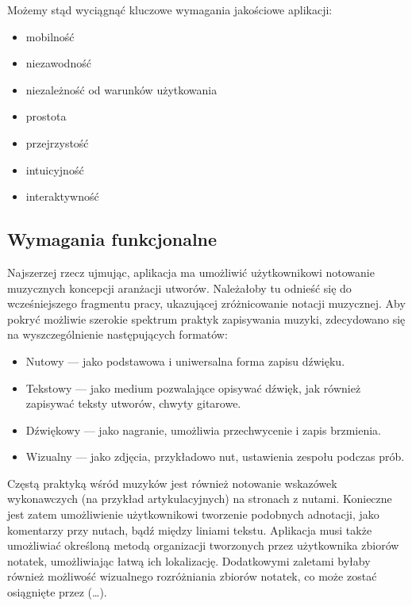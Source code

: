 \documentclass[12pt]{article}
\begin{document}
Możemy stąd wyciągnąć kluczowe wymagania jakościowe aplikacji:
\begin{itemize}
	\item mobilność
	\item niezawodność
	\item niezależność od warunków użytkowania
	\item prostota
	\item przejrzystość
	\item intuicyjność
	\item interaktywność
\end{itemize}

\subsection{Wymagania funkcjonalne}
\label{subsec:wymagania-funkcjonalne}
Najszerzej rzecz ujmując, aplikacja ma umożliwić użytkownikowi notowanie muzycznych koncepcji aranżacji utworów.
Należałoby tu odnieść się do wcześniejszego fragmentu pracy, ukazującej zróżnicowanie notacji muzycznej.
Aby pokryć możliwie szerokie spektrum praktyk zapisywania muzyki,
zdecydowano się na wyszczególnienie następujących formatów:
\begin{itemize}
	\item Nutowy — jako podstawowa i uniwersalna forma zapisu dźwięku.
	\item Tekstowy — jako medium pozwalające opisywać dźwięk, jak również zapisywać teksty utworów, chwyty gitarowe.
	\item Dźwiękowy — jako nagranie, umożliwia przechwycenie i zapis brzmienia.
	\item Wizualny — jako zdjęcia, przykładowo nut, ustawienia zespołu podczas prób.
\end{itemize}

Częstą praktyką wśród muzyków jest również notowanie wskazówek wykonawczych (na przykład artykulacyjnych)
na stronach z nutami.
Konieczne jest zatem umożliwienie użytkownikowi tworzenie podobnych adnotacji, jako komentarzy przy nutach,
bądź między liniami tekstu.
Aplikacja musi także umożliwiać określoną metodą organizacji tworzonych przez użytkownika zbiorów notatek,
umożliwiając łatwą ich lokalizację.
Dodatkowymi zaletami byłaby również możliwość wizualnego rozróżniania zbiorów notatek,
co może zostać osiągnięte przez (\ldots).
\end{document}
